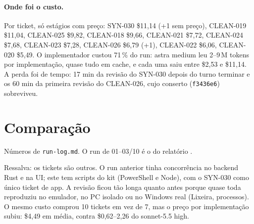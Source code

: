 \documentclass[11pt,a4paper]{article}
\begin{document}
\paragraph{Onde foi o custo.} Por ticket, só estágios com preço: SYN-030
\$11,14 (+1 sem preço), CLEAN-019 \$11,04, CLEAN-025 \$9,82, CLEAN-018
\$9,66, CLEAN-021 \$7,72, CLEAN-024 \$7,68, CLEAN-023 \$7,28, CLEAN-026 \$6,79
(+1), CLEAN-022 \$6,06, CLEAN-020 \$5,49. O implementador custou 71\,\% do
run: astra medium leu 2--9\,M tokens por implementação, quase tudo em cache,
e cada uma saiu entre \$2,53 e \$11,14. A perda foi de tempo: 17 min da
revisão do SYN-030 depois do turno terminar e os 60 min da primeira revisão
do CLEAN-026, cujo conserto (\texttt{f3436e6}) sobreviveu.

\section{Comparação}

Números de \texttt{run-log.md}. O run de 01--03/10 é o do relatório
.

\medskip
{}

\medskip
Ressalva: os tickets são outros. O run anterior tinha concorrência no backend
Rust e na UI; este tem scripts do kit (PowerShell e Node), com o SYN-030 como
único ticket de app. A revisão ficou tão longa quanto antes porque quase toda
reproduziu no emulador, no PC isolado ou no Windows real (Lixeira, processos).
O mesmo custo comprou 10 tickets em vez de 7, mas o preço por implementação
subiu: \$4,49 em média, contra \$0,62--2,26 do sonnet-5.5 high.
\end{document}

